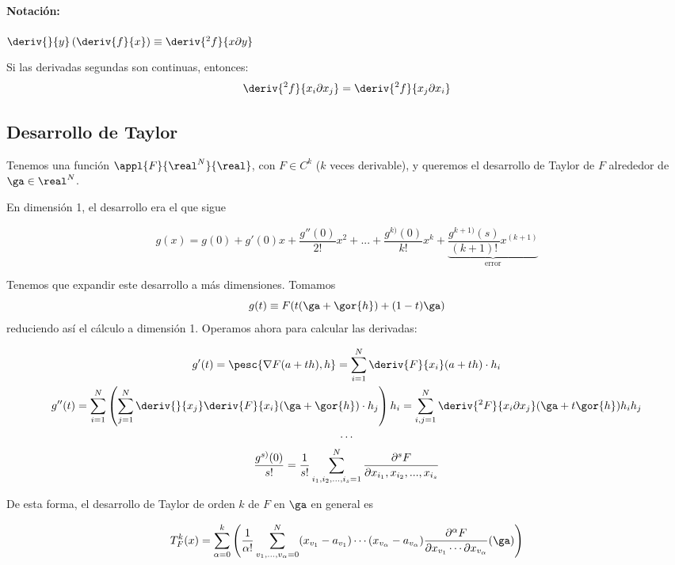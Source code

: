 \paragraph{Notación:}

$\deriv{}{y}\left(\deriv{f}{x}\right) \equiv \deriv{^2f}{x \partial y}$

\begin{theorem}
Si las derivadas segundas son continuas, entonces:
$$\deriv{^2f}{x_i\partial x_j} = \deriv{^2 f}{x_j \partial x_i}$$
\end{theorem}



\subsection{Desarrollo de Taylor}
Tenemos una función $\appl{F}{\real^N}{\real}$, con $F\in C^k$ ($k$ veces derivable), y queremos el desarrollo de Taylor de $F$ alrededor de $\ga \in \real^N$.

En dimensión 1, el desarrollo era el que sigue

\[ g(x) = g(0) + g'(0)x + \frac{g''(0)}{2!}x^2 + ... + \frac{g^{k)}(0)}{k!}x^k + \underbrace{\frac{g^{k+1)}(s)}{(k+1)!}x^{(k+1)}}_{\text{error}} \]

Tenemos que expandir este desarrollo a más dimensiones. Tomamos \[ g(t) \equiv F(t(\ga + \gor{h}) + (1-t)\ga) \] reduciendo así el cálculo a dimensión 1. Operamos ahora para calcular las derivadas:

\begin{gather*}
g'(t) = \pesc{\nabla F(a+th),h} = \sum_{i=1}^N \deriv{F}{x_i}(a+th)\cdot h_i \\
g''(t) = \sum_{i=1}^N\left(\sum_{j=1}^N \deriv{}{x_j}\deriv{F}{x_i}(\ga+\gor{h})\cdot{h_j}\right)h_i = \sum_{i,j = 1}^N \deriv{^2F}{x_i \partial x_j}(\ga+t\gor{h})h_ih_j \\
\dotsb \\
\frac{g^{s)} (0)}{s!} = \frac{1}{s!}\sum_{i_1,i_2,...,i_s=1}^N \frac{\partial^s F}{\partial x_{i_1},x_{i_2},...,x_{i_s}}
\end{gather*}

De esta forma, el desarrollo de Taylor de orden $k$ de $F$ en $\ga$ en general es

\begin{equation}
T^k_F(x) = \sum_{\alpha = 0}^k 
	\left( 
		\frac{1}{\alpha !}
		\sum_{v_1,\dotsc,v_\alpha = 0}^N 
			(x_{v_1} - a_{v_1}) \dotsb (x_{v_\alpha} - a_{v_\alpha}) 
			\frac{\partial^\alpha F}{\partial x_{v_1} \dotsb \partial x_{v_\alpha}} 
			 (\ga)
	\right) 
\end{equation}

